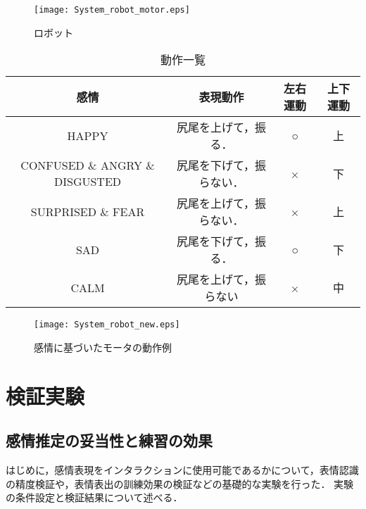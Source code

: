 \documentclass[titlepage]{jarticle}
\begin{document}
\begin{figure}[h]
\begin{center}
\texttt{[image: System\_robot\_motor.eps]}
\end{center}
\caption{ロボット}
\label{Robot} %
\end{figure}

\begin{table}[h]
\centering
\caption{動作一覧}
\begin{tabular}{|c||c|c|c|}
    \hline
		感情 & 表現動作 & 左右運動 & 上下運動 \\
	\hline
	\hline
		HAPPY & 尻尾を上げて，振る． & ○ & 上\\
	\hline
		CONFUSED \& ANGRY \& DISGUSTED & 尻尾を下げて，振らない． & × & 下 \\
	\hline
		SURPRISED \& FEAR & 尻尾を上げて，振らない． & × & 上 \\
	\hline
		SAD & 尻尾を下げて，振る． &  ○ & 下 \\
	\hline
        CALM & 尻尾を上げて，振らない & × & 中 \\
	\hline
\end{tabular}
\label{Servo Control}
\end{table}

\begin{figure}[h]
\begin{center}
\texttt{[image: System\_robot\_new.eps]}
\end{center}
\caption{感情に基づいたモータの動作例}
\label{Robot 3} %
\end{figure}


\afterpage{\clearpage}






\newpage
\section{{検証実験}}

\subsection{感情推定の妥当性と練習の効果}
はじめに，感情表現をインタラクションに使用可能であるかについて，表情認識の精度検証や，表情表出の訓練効果の検証などの基礎的な実験を行った．
実験の条件設定と検証結果について述べる．
\end{document}
